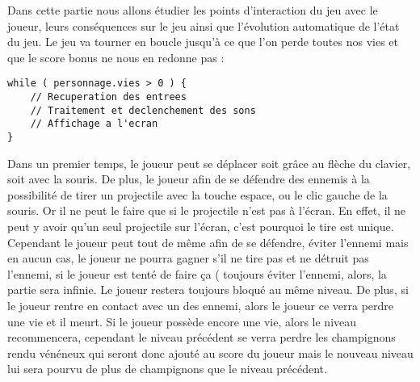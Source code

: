 Dans cette partie nous allons étudier les points d'interaction du jeu avec le joueur, leurs conséquences sur le jeu ainsi que l'évolution automatique de l'état du jeu. 
Le jeu va tourner en boucle jusqu'à ce que l'on perde toutes nos vies et que le score bonus ne nous en redonne pas :
\begin{lstlisting}
while ( personnage.vies > 0 ) {
	// Recuperation des entrees
	// Traitement et declenchement des sons
	// Affichage a l'ecran
}
\end{lstlisting}
Dans un premier temps, le joueur peut se déplacer soit grâce au flèche du clavier, soit avec la souris. De plus, le joueur afin de se défendre des ennemis à la possibilité de tirer un projectile avec la touche espace, ou le clic gauche de la souris. Or il ne peut le faire que si le projectile n'est pas à l'écran. En effet, il ne peut y avoir qu'un seul projectile sur l'écran, c'est pourquoi le tire est unique. Cependant le joueur peut tout de même afin de se défendre, éviter l'ennemi mais en aucun cas, le joueur ne pourra gagner s'il ne tire pas et ne détruit pas l'ennemi, si le joueur est tenté de faire ça ( toujours éviter l'ennemi, alors, la partie sera infinie. Le joueur restera toujours bloqué au même niveau. De plus, si le joueur rentre en contact avec un des ennemi, alors le joueur ce verra perdre une vie et il meurt. Si le joueur possède encore une vie, alors le niveau recommencera, cependant le niveau précédent se verra perdre les champignons rendu vénéneux qui seront donc ajouté au score du joueur mais le nouveau niveau lui sera pourvu de plus de champignons que le niveau précédent. 
